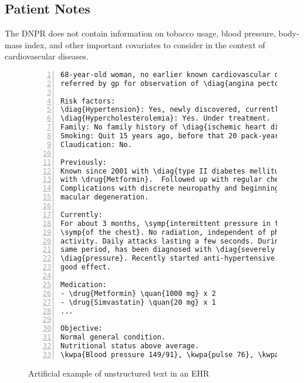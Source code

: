\subsection{Patient Notes}

The DNPR does not contain information on tobacco usage, blood pressure, 
body-mass index, and other important covariates to consider in the
context of cardiovascular diseases.

\begin{figure}
{
\newcommand{\cbox}[2]{%
    \tcbox[on line, colback=#1!50!white, boxsep=1.5pt, colframe=black,
           valign=center, left=0pt, right=0pt, top=0pt, bottom=0pt, boxrule=1pt]{#2}%
}%
\newcommand{\diag}[1]{\cbox{color3}{#1}}
\newcommand{\symp}[1]{\cbox{color4}{#1}}
\newcommand{\drug}[1]{\cbox{color5}{#1}}
\newcommand{\quan}[1]{\cbox{color6}{#1}}
\newcommand{\kwpa}[1]{\cbox{color7}{#1}}

\begin{Verbatim}[commandchars=\\\{\}, fontsize=\scriptsize, 
    frame=single, framesep=1em, numbers=left, numbersep=3pt]
68-year-old woman, no earlier known cardiovascular disease, 
referred by gp for observation of \diag{angina pectoris}.

Risk factors:
\diag{Hypertension}: Yes, newly discovered, currently well-treated.
\diag{Hypercholesterolemia}: Yes. Under treatment.
Family: No family history of \diag{ischemic heart disease}.
Smoking: Quit 15 years ago, before that 20 pack-years.
Claudication: No.

Previously:
Known since 2001 with \diag{type II diabetes mellitus}, treated 
with \drug{Metformin}.  Followed up with regular checks. 
Complications with discrete neuropathy and beginning 
macular degeneration.

Currently:
For about 3 months, \symp{intermittent pressure in the left side}
\symp{of the chest}. No radiation, independent of physical 
activity. Daily attacks lasting a few seconds. During the 
same period, has been diagnosed with \diag{severely elevated blood}
\diag{pressure}. Recently started anti-hypertensive treatment with
good effect.

Medication:
- \drug{Metformin} \quan{1000 mg} x 2
- \drug{Simvastatin} \quan{20 mg} x 1
...

Objective:
Normal general condition.
Nutritional status above average.
\kwpa{Blood pressure 149/91}, \kwpa{pulse 76}, \kwpa{height 177 cm}, \kwpa{weight 96 kg}
\end{Verbatim}
}
\caption{Artificial example of unstructured text in an \ac{EHR}}
\end{figure}%
